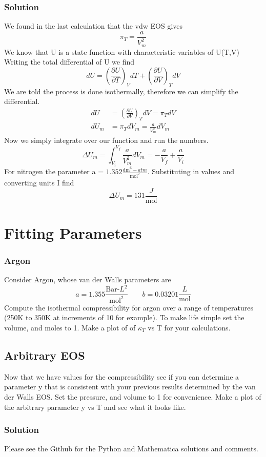 \documentclass{article}
\newcommand{\be}{\begin{equation}}
\newcommand{\ee}{\end{equation}}
\newcommand{\pd}{\partial}
\begin{document}
\subsubsection{Solution}
We found in the last calculation that the vdw EOS gives 
\be
\pi_T = \frac{a}{V^2_m} 
\ee
We know that U is a state function with characteristic variables of U(T,V)
Writing the total differential of U we find
\be
dU = \left(\frac{\pd U}{\pd T}\right)_VdT + \left(\frac{\pd U}{\pd V}\right)_TdV 
\ee
We are told the process is done isothermally, therefore we can simplify the differential. 
\be
\begin{split}
dU &= \left(\frac{\pd U}{\pd V}\right)_TdV = \pi_TdV \\
dU_m &= \pi_TdV_m = \frac{a}{V_m^2} dV_m
\end{split}
\ee
Now we simply integrate over our function and run the numbers.
\be
\Delta U_m = \int_{V_i}^{V_f} \frac{a}{V_m^2} dV_m = -\frac{a}{V_f} + \frac{a}{V_i}
\ee
For nitrogen the parameter a = $1.352 \frac{\text{dm}^6-atm}{\text{mol}^2}$.
Substituting in values and converting units I find
\be
\Delta U_m = 131 \frac{J}{\text{mol}}
\ee

\section{Fitting Parameters}

\subsubsection*{Argon}
Consider Argon, whose van der Walls parameters are
\be
a = 1.355 \frac{\text{Bar-}L^2}{\text{mol}^2} \qquad b = 0.03201 \frac{L}{\text{mol}}
\ee
Compute the isothermal compressibility for argon over a range of temperatures (250K to 350K at increments of 10 for example). 
To make life simple set the volume, and moles to 1. 
Make a plot of of $\kappa_T$ vs T for your calculations. 

\subsection{Arbitrary EOS}
Now that we have values for the compressibility see if you can determine a parameter y that is consistent with your previous results determined by the van der Walls EOS. 
Set the pressure, and volume to 1 for convenience. 
Make a plot of the arbitrary parameter y vs T and see what it looks like.

\subsubsection{Solution}
Please see the Github for the Python and Mathematica solutions and comments. 
\end{document}
